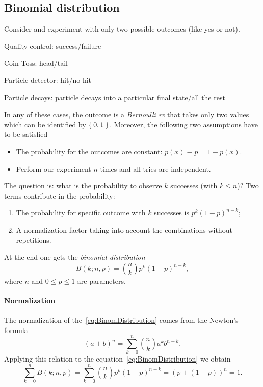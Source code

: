 \subsection{Binomial distribution}

Consider and experiment with only two possible outcomes (like yes or not). 

Quality control: success/failure

Coin Toss: head/tail

Particle detector: hit/no hit

Particle decays: particle decays into a particular final state/all the rest


In any of these cases, the outcome is a \emph{Bernoulli \ac{rv}} that takes only two values which can be identified by $\Set{0,1}$.
Moreover, the following two assumptions have to be satisfied
\begin{itemize}
	\item
		The probability for the outcomes are constant: $p(x) \equiv p = 1-p(\bar{x})$.
	\item
		Perform our experiment $n$ times and all tries are independent.
\end{itemize}
The question is: what is the probability to observe $k$ successes (with $k\le n$)?
Two terms contribute in the probability:
\begin{enumerate}
	\item
		The probability for specific outcome with $k$ successes is $p^k(1-p)^{n-k}$;
	\item
		A normalization factor taking into account the combinations without repetitions. %
\end{enumerate}
At the end one gets the \emph{binomial distribution}
\begin{equation}\label{eq:BinomDistribution}
	B(k;n,p) = {n\choose k}p^k(1-p)^{n-k},
\end{equation}
where $n$ and $0 \le p\le 1$ are parameters.

\paragraph{Normalization}
The normalization of the~\eqref{eq:BinomDistribution} comes from the Newton's formula
\begin{equation}
	(a+b)^n = \sum_{k=0}^n {n\choose k} a^k b^{n-k}.
\end{equation}
Applying this relation to the equation~\eqref{eq:BinomDistribution} we obtain
\begin{equation}
	\sum_{k=0}^n B(k;n,p) =
	\sum_{k=0}^n {n\choose k}p^k(1-p)^{n-k}
	= (p + (1-p))^n = 1.
\end{equation}


